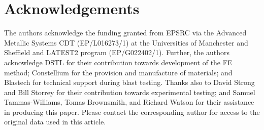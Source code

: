 
\section*{Acknowledgements}
\label{Acknowledgements}
The authors acknowledge the funding granted from EPSRC via the Advanced Metallic Systems CDT (EP/L016273/1) at the Universities of Manchester and Sheffield and LATEST2 program (EP/G022402/1). Further, the authors acknowledge DSTL for their contribution towards development of the FE method; Constellium for the provision and manufacture of materials; and Blastech for technical support during blast testing. Thanks also to David Strong and Bill Storrey for their contribution towards experimental testing; and Samuel Tammas-Williams, Tomas Brownsmith, and Richard Watson for their assistance in producing this paper. Please contact the corresponding author for access to the original data used in this article.




